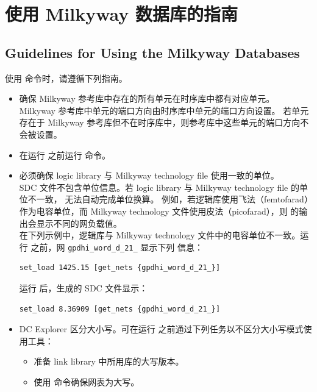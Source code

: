 \section{使用 Milkyway 数据库的指南}
\subsection*{Guidelines for Using the Milkyway Databases}

使用  命令时，请遵循下列指南。
\begin{itemize}
  \item 确保 Milkyway 参考库中存在的所有单元在时序库中都有对应单元。
        Milkyway 参考库中单元的端口方向由时序库中单元的端口方向设置。
        若单元存在于 Milkyway 参考库但不在时序库中，则参考库中这些单元的端口方向不会被设置。
  \item 在运行  之前运行  命令。
  \item 必须确保 logic library 与 Milkyway technology file 使用一致的单位。\\
        SDC 文件不包含单位信息。若 logic library 与 Milkyway technology file 的单位不一致， 无法自动完成单位换算。
        例如，若逻辑库使用飞法（femtofarad）作为电容单位，而 Milkyway technology 文件使用皮法（picofarad），则  的输出会显示不同的网负载值。\\
        在下列示例中，逻辑库与 Milkyway technology 文件中的电容单位不一致。运行  之前，网 \texttt{gpdhi\_word\_d\_21\_} 显示下列  信息：
\begin{lstlisting}
set_load 1425.15 [get_nets {gpdhi_word_d_21_}]
\end{lstlisting}
        运行  后，生成的 SDC 文件显示：
\begin{lstlisting}
set_load 8.36909 [get_nets {gpdhi_word_d_21_}]
\end{lstlisting}
  \item DC Explorer 区分大小写。可在运行  之前通过下列任务以不区分大小写模式使用工具：
  \begin{itemize}
    \item 准备 link library 中所用库的大写版本。
    \item 使用  命令确保网表为大写。
  \end{itemize}
\end{itemize}

